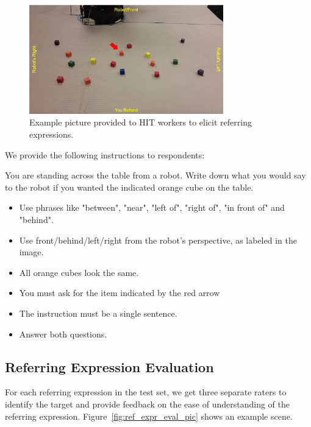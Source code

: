 \documentclass[letterpaper,10pt]{article}
\begin{document}
\begin{figure}[htb]
  \centering
    \includegraphics[width=0.75\textwidth]{ref_expr_elicit_pic}
  \caption{Example picture provided to HIT workers to elicit referring expressions.}
  \label{fig:ref_expr_elicit_pic}
\end{figure}

We provide the following instructions to respondents:

\begin{framed}
You are standing across the table from a robot. Write down what you would say to the robot if you wanted the indicated orange cube on the table.
\begin{itemize}[topsep=0pt,itemsep=-1ex,partopsep=1ex,parsep=1ex]
\item Use phrases like "between", "near", "left of", "right of", "in front of" and "behind".
\item Use front/behind/left/right from the robot's perspective, as labeled in the image. 
\item All orange cubes look the same.
\item You must ask for the item indicated by the red arrow
\item The instruction must be a single sentence.
\item Answer both questions.
\end{itemize}
\end{framed}

\subsection{Referring Expression Evaluation}

For each referring expression in the test set, we get three separate raters to identify the target and provide feedback on the ease of understanding of the referring expression. Figure~\ref{fig:ref_expr_eval_pic} shows an example scene.
\end{document}
